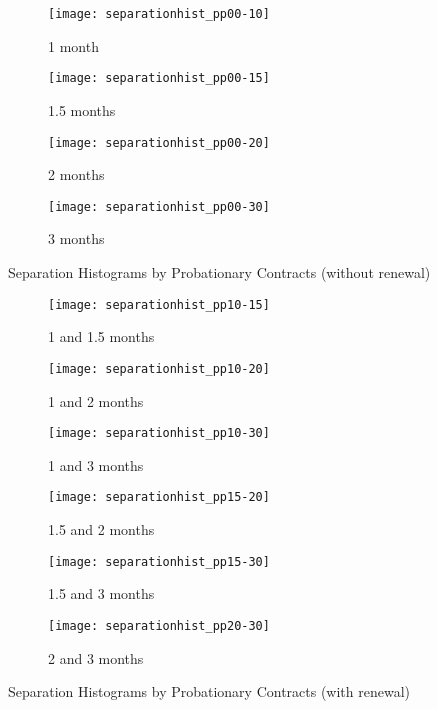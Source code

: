 \documentclass[12pt]{article}
\begin{document}
\newpage

\begin{figure}[h!]
\begin{subfigure}{.5\textwidth}
  \centering
  \texttt{[image: separationhist\_pp00-10]}
  \caption{1 month}
  \label{fig:separationhist_pp00-10}
\end{subfigure}
\begin{subfigure}{.5\textwidth}
  \centering
  \texttt{[image: separationhist\_pp00-15]}
  \caption{1.5 months}
  \label{fig:separationhist_pp00-15}
\end{subfigure}
\begin{subfigure}{.5\textwidth}
  \centering
  \texttt{[image: separationhist\_pp00-20]}
  \caption{2 months}
  \label{fig:separationhist_pp00-20}
\end{subfigure}
\begin{subfigure}{.5\textwidth}
  \centering
  \texttt{[image: separationhist\_pp00-30]}
  \caption{3 months}
  \label{fig:separationhist_pp00-30}
\end{subfigure}
\caption{Separation Histograms by Probationary Contracts (without renewal)}
\label{fig:separationhist}
\end{figure}

\newpage 

\begin{figure}[h!]
\begin{subfigure}{.5\textwidth}
  \centering
  \texttt{[image: separationhist\_pp10-15]}
  \caption{1 and 1.5 months}
  \label{fig:separationhist_pp10-15}
\end{subfigure}
\begin{subfigure}{.5\textwidth}
  \centering
  \texttt{[image: separationhist\_pp10-20]}
  \caption{1 and 2 months}
  \label{fig:separationhist_pp10-20}
\end{subfigure}
\begin{subfigure}{.5\textwidth}
  \centering
  \texttt{[image: separationhist\_pp10-30]}
  \caption{1 and 3 months}
  \label{fig:separationhist_pp10-30}
\end{subfigure}
\begin{subfigure}{.5\textwidth}
  \centering
  \texttt{[image: separationhist\_pp15-20]}
  \caption{1.5 and 2 months}
  \label{fig:separationhist_pp15-20}
\end{subfigure}
\begin{subfigure}{.5\textwidth}
  \centering
  \texttt{[image: separationhist\_pp15-30]}
  \caption{1.5 and 3 months}
  \label{fig:separationhist_pp15-30}
\end{subfigure}
\begin{subfigure}{.5\textwidth}
  \centering
  \texttt{[image: separationhist\_pp20-30]}
  \caption{2 and 3 months}
  \label{fig:separationhist_pp20-30}
\end{subfigure}
\caption{Separation Histograms by Probationary Contracts (with renewal)}
\label{fig:separationhist_excluded}
\end{figure}
\end{document}
